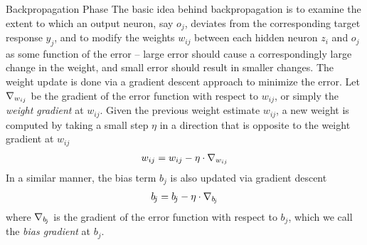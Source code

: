 \begin{frame}{Backpropagation Phase}
The basic idea behind backpropagation is to examine the extent to which
an output neuron, say $o_{\!j}$, deviates from the corresponding 
target response $y_{\!j}$, and to modify the
weights $w_{ij}$ between each hidden neuron $z_i$ and $o_{\!j}$ as some
function of the error -- large error should cause a correspondingly
large change in the weight, and small error should result in smaller
changes. 
%
The weight update is done via a gradient descent approach to minimize
the error. 
Let $\nabla_{w_{ij}}$ be the gradient of the error function with
respect to $w_{ij}$, or simply the {\em weight gradient} at
$w_{ij}$.
Given the previous weight estimate $w_{ij}$, 
a new weight is computed by taking a
small step $\eta$ in a direction that is opposite to the weight gradient 
at $w_{ij}$
\begin{align}
    w_{ij} = w_{ij} - \eta \cdot \nabla_{w_{ij}}
\end{align}
In a similar manner, the bias term $b_{\!j}$ is also updated via gradient
descent
\begin{align}
    b_{\!j} = b_{\!j} - \eta \cdot \nabla_{b_{\!j}}
\end{align}
where 
$\nabla_{b_{\!j}}$ is the gradient of the error function with
respect to $b_{\!j}$, which we call the {\em bias gradient} at
$b_{\!j}$.
\end{frame}
%
%
